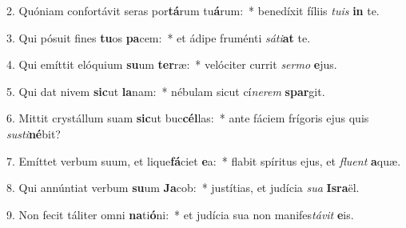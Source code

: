 2. Quóniam confortávit seras por\textbf{tá}rum tu\textbf{á}rum:~*  benedíxit fíliis \textit{tu}\textit{is} \textbf{in} te.\

3. Qui pósuit fines \textbf{tu}os \textbf{pa}cem:~*  et ádipe fruménti \textit{sá}\textit{ti}\textbf{at} te.\

4. Qui emíttit elóquium \textbf{su}um \textbf{ter}ræ:~*  velóciter currit \textit{ser}\textit{mo} \textbf{e}jus.\

5. Qui dat nivem \textbf{sic}ut \textbf{la}nam:~*  nébulam sicut cí\textit{ne}\textit{rem} \textbf{spar}git.\

6. Mittit crystállum suam \textbf{sic}ut buc\textbf{cél}las:~*  ante fáciem frígoris ejus quis \textit{sus}\textit{ti}\textbf{né}bit?\

7. Emíttet verbum suum, et lique\textbf{fá}ciet \textbf{e}a:~*  flabit spíritus ejus, et \textit{flu}\textit{ent} \textbf{a}quæ.\

8. Qui annúntiat verbum \textbf{su}um \textbf{Ja}cob:~*  justítias, et judícia \textit{su}\textit{a} \textbf{Is}\textbf{ra}ël.\

9. Non fecit táliter omni \textbf{na}ti\textbf{ó}ni:~*  et judícia sua non manifes\textit{tá}\textit{vit} \textbf{e}is.\

